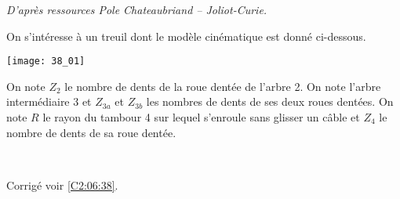 \normaltrue \difficilefalse \tdifficilefalse
\correctionfalse


\textit{D'après ressources Pole Chateaubriand -- Joliot-Curie.}
\setcounter{question}{0}
\ifcorrection
\else
{}
\fi

\ifprof
\else
On s’intéresse à un treuil dont le modèle cinématique est donné ci-dessous.
\begin{center}
\texttt{[image: 38\_01]}
\end{center}

On note $Z_2$ le nombre de dents de la roue dentée de l'arbre 2. On note l'arbre intermédiaire 3 et $Z_{3a}$ et $Z_{3b}$ les nombres de dents de ses deux roues dentées. On note $R$ le rayon du tambour 4 sur lequel s’enroule sans glisser un câble et $Z_4$ le nombre de dents de sa roue dentée.
\fi


\ifprof
\else
\fi

\ifprof ~\\

\else
\fi


\ifprof
\else
\begin{flushright}
\footnotesize{Corrigé  voir \ref{C2:06:38}.}
\end{flushright}%
\fi